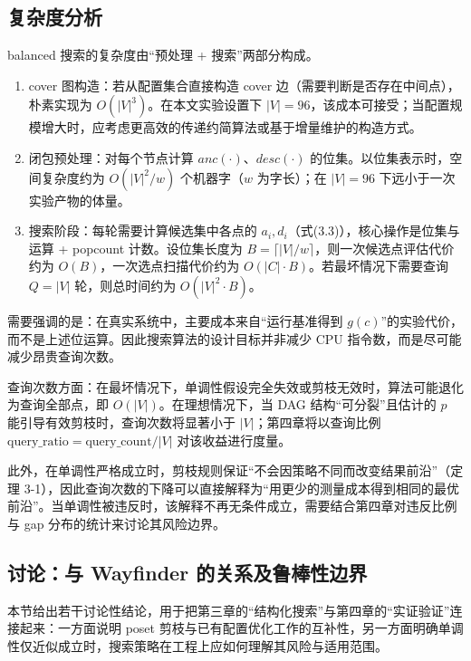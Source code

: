 \documentclass[UTF8,a4paper,12pt,twoside]{ctexart}  %
\begin{document}
\subsection{复杂度分析}

balanced 搜索的复杂度由``预处理 + 搜索''两部分构成。

\begin{enumerate}
\def\labelenumi{\arabic{enumi}.}
\item
  cover 图构造：若从配置集合直接构造 cover
  边（需要判断是否存在中间点），朴素实现为
  \(O(|V|^3)\)。在本文实验设置下
  \(|V|=96\)，该成本可接受；当配置规模增大时，应考虑更高效的传递约简算法或基于增量维护的构造方式。
\item
  闭包预处理：对每个节点计算 \(anc(\cdot)\)、\(desc(\cdot)\)
  的位集。以位集表示时，空间复杂度约为 \(O(|V|^2/w)\) 个机器字（\(w\)
  为字长）；在 \(|V|=96\) 下远小于一次实验产物的体量。
\item
  搜索阶段：每轮需要计算候选集中各点的
  \(a_i,d_i\)（式(3.3)），核心操作是位集与运算 + popcount
  计数。设位集长度为 \(B=\lceil |V|/w \rceil\)，则一次候选点评估代价约为
  \(O(B)\)，一次选点扫描代价约为 \(O(|C|\cdot B)\)。若最坏情况下需要查询
  \(Q=|V|\) 轮，则总时间约为 \(O(|V|^2\cdot B)\)。
\end{enumerate}

需要强调的是：在真实系统中，主要成本来自``运行基准得到
\(g(c)\)''的实验代价，而不是上述位运算。因此搜索算法的设计目标并非减少
CPU 指令数，而是尽可能减少昂贵查询次数。

查询次数方面：在最坏情况下，单调性假设完全失效或剪枝无效时，算法可能退化为查询全部点，即
\(O(|V|)\)。在理想情况下，当 DAG 结构``可分裂''且估计的 \(p\)
能引导有效剪枝时，查询次数将显著小于 \(|V|\)；第四章将以查询比例
\(\text{query\_ratio}=\text{query\_count}/|V|\) 对该收益进行度量。

此外，在单调性严格成立时，剪枝规则保证``不会因策略不同而改变结果前沿''（定理
3-1），因此查询次数的下降可以直接解释为``用更少的测量成本得到相同的最优前沿''。当单调性被违反时，该解释不再无条件成立，需要结合第四章对违反比例与
gap 分布的统计来讨论其风险边界。

\subsection{讨论：与 Wayfinder
的关系及鲁棒性边界}

本节给出若干讨论性结论，用于把第三章的``结构化搜索''与第四章的``实证验证''连接起来：一方面说明
poset
剪枝与已有配置优化工作的互补性，另一方面明确单调性仅近似成立时，搜索策略在工程上应如何理解其风险与适用范围。
\end{document}
